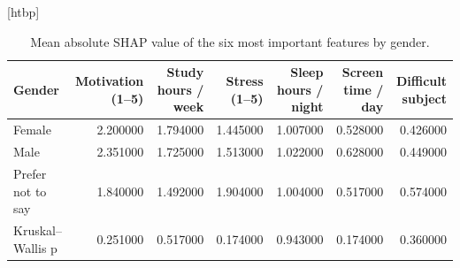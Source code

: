 \begin{table}
\small[htbp]
\caption{Mean absolute SHAP value of the six most important features by gender.}
\label{tab:A07a_shap_by_gender}
\begin{tabular}{lrrrrrr}
\toprule
Gender & Motivation (1–5) & Study hours / week & Stress (1–5) & Sleep hours / night & Screen time / day & Difficult subject \\
\midrule
Female & 2.200000 & 1.794000 & 1.445000 & 1.007000 & 0.528000 & 0.426000 \\
Male & 2.351000 & 1.725000 & 1.513000 & 1.022000 & 0.628000 & 0.449000 \\
Prefer not to say & 1.840000 & 1.492000 & 1.904000 & 1.004000 & 0.517000 & 0.574000 \\
Kruskal–Wallis p & 0.251000 & 0.517000 & 0.174000 & 0.943000 & 0.174000 & 0.360000 \\
\bottomrule
\end{tabular}
\end{table}
